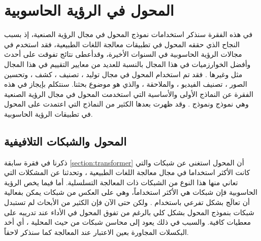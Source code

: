 \section{المحول في الرؤية الحاسوبية}
في هذه الفقرة سنذكر استخدامات نموذج المحول في مجال الرؤية الصنعية، إذ بسبب النجاح الذي حققه المحول في تطبيقات معالجة اللغات الطبيعية، فقد استخدم في مجالات الرؤية الحاسوبية في السنوات الأخيرة، وقدأعطى نتائج تفوقت على أحدث وأفضل الخوارزميات في هذا المجال بالنسبة للعديد من معايير التقييم في هذا المجال مثل 
وغيرها
.
فقد تم استخدام المحول في مجال توليد
،
تصنيف
،
كشف
،
وتحسين الصور
،
تصنيف الفيديو
،
والملاحقة
،
والذي هو موضوع بحثنا.
\newline
سنتكلم بإيجاز في هذه الفقرة عن النماذج الأولى والأساسية التي استخدمت المحول في مجال الرؤية الصنعية وهي نموذج
ونموذج
.
وقد ظهرت بعدها الكثير من النماذج التي اعتمدت على المحول في تطبيقات الرؤية الحاسوبية.
\subsection{المحول والشبكات التلافيفية}
ذكرنا في فقرة سابقة 
\ref{section:transformer}
أن المحول استغنى عن شبكات 
والتي كانت الأكثر استخداما في مجال معالجة اللغات الطبيعية
،
وتحدثنا عن المشكلات التي تعاني منها هذا النوع من الشبكات ذات المعالجة التسلسلية. أما فيما يخص الرؤية الحاسوبية فإن شبكات
هي الأكثر استخداماً، وهي على العكس من شبكات 
يمكن بفعالية أن تعالَج بشكل تفرعي باستخدام  
.
ولكن حتى الآن فإن الكثير من الأبحاث لم تستبدل شبكات
بنموذج المحول بشكل كلي بالرغم من تفوق المحول في الأداء عند تدريبه على معطيات كافية. والسبب في ذلك يعود إلى محاسن شبكات 
من حيث المحلية
،
أي أخد البكسلات المجاورة بعين الاعتبار عند المعالجة كما سنذكر لاحقاً.
